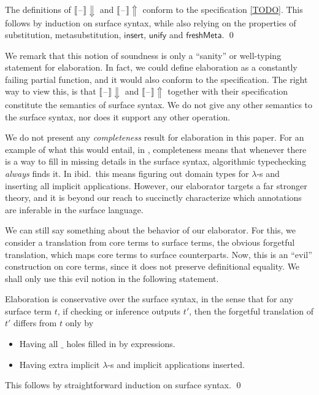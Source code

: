 \documentclass[acmsmall,review,anonymous,prologue,dvipsnames]{acmart}\settopmatter{printfolios=true,printccs=false,printacmref=false}
\newcommand{\blank}{\mathord{\hspace{1pt}\text{--}\hspace{1pt}}}
\newcommand{\unify}{\mathsf{unify}}
\newcommand{\echeckblank}{\llbracket\blank\rrbracket\!\Downarrow}
\newcommand{\einferblank}{\llbracket\blank\rrbracket\!\Uparrow}
\theoremstyle{remark}
\begin{document}
\begin{theorem} The definitions of $\echeckblank$ and
$\einferblank$ conform to the specification \ref{TODO}. This follows by
  induction on surface syntax, while also relying on the properties of
  substitution, metasubstitution, $\mathsf{insert}$, $\unify$ and
  $\mathsf{freshMeta}$. \qed
\end{theorem}

We remark that this notion of soundness is only a ``sanity'' or well-typing
statement for elaboration. In fact, we could define elaboration as a constantly
failing partial function, and it would also conform to the specification. The
right way to view this, is that $\echeckblank$ and $\einferblank$ together
with their specification constitute the semantics of surface syntax. We do not
give any other semantics to the surface syntax, nor does it support any other
operation.

We do not present any \emph{completeness} result for elaboration in this
paper. For an example of what this would entail, in \cite{dunfield2013complete},
completeness means that whenever there is a way to fill in missing details in
the surface syntax, algorithmic typechecking \emph{always} finds it. In
ibid.\ this means figuring out domain types for $\lambda$-s and inserting all
implicit applications. However, our elaborator targets a far stronger theory,
and it is beyond our reach to succinctly characterize which annotations are
inferable in the surface language.

We can still say something about the behavior of our elaborator. For this, we
consider a translation from core terms to surface terms, the obvious forgetful
translation, which maps core terms to surface counterparts. Now, this is an
``evil'' construction on core terms, since it does not preserve definitional
equality. We shall only use this evil notion in the following statement.

\begin{theorem}[Conservativity]
Elaboration is conservative over the surface syntax, in the sense that for any
surface term $t$, if checking or inference outputs $t'$, then the forgetful
translation of $t'$ differs from $t$ only by
  \begin{itemize}
    \item Having all $\_$ holes filled in by expressions.
    \item Having extra implicit $\lambda$-s and implicit applications inserted.
  \end{itemize}
This follows by straightforward induction on surface syntax. \qed
\end{theorem}
\end{document}
